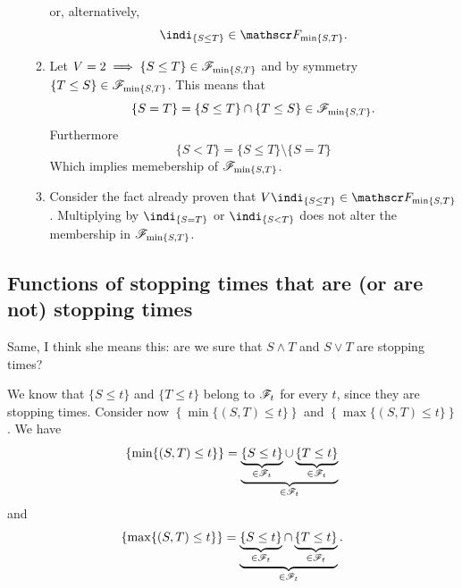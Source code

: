 \documentclass{report}
\begin{document}
\begin{fancyproof}
\begin{enumerate}
\begin{enumerate}
			or, alternatively,
			\[\indi_{\{S\leq T\}}\in\F_{\min\{S,T\}}.\]
			\item Let $V=2\implies\{S\leq T\}\in\mathscr{F}_{\min\{S,T\}}$ and by symmetry $\{T\leq S\}\in\mathscr{F}_{\min\{S,T\}}$. This means that 
			\begin{equation*}
				\{S=T\}=\{S\leq T\}\cap\{T\leq S\}\in\mathscr{F}_{\min\{S,T\}}.
			\end{equation*}
			Furthermore 
			\[\{S<T\}=\{S\leq T\}\setminus\{S=T\}\]
			Which implies memebership of $\mathscr{F}_{\min\{S,T\}}$.
			\item Consider the fact already proven that $V\indi_{\{S\leq T\}}\in\F_{\min\{S,T\}}$. Multiplying by $\indi_{\{S=T\}}$ or $\indi_{\{S<T\}}$ does not alter the membership in $\mathscr{F}_{\min\{S,T\}}$.
		\end{enumerate}
	\end{enumerate}
\end{fancyproof}
\subsection{Functions of stopping times that are (or are not) stopping times}
Same, I think she means this:
are we sure that $S\wedge T$ and $S\vee T$ are stopping times?
\begin{fancyproof}
	We know that $\{S\leq t\}$ and $\{T\leq t\}$ belong to $\mathscr{F}_t$ for every $t$, since they are stopping times. Consider now $\left\{\min\{(S,T)\leq t\}\right\}$ and $\left\{\max\{(S,T)\leq t\}\right\}$. We have
	\begin{equation*}
		\left\{\min\{(S,T)\leq t\}\right\}=\underbrace{\underbrace{\{S\leq t\}}_{\in\mathscr{F}_t}\cup\underbrace{\{T\leq t\}}_{\in\mathscr{F}_t}}_{\in\mathscr{F}_t}
	\end{equation*}
	and 
	\begin{equation*}
		\left\{\max\{(S,T)\leq t\}\right\}=\underbrace{\underbrace{\{S\leq t\}}_{\in\mathscr{F}_t}\cap\underbrace{\{T\leq t\}}_{\in\mathscr{F}_t}}_{\in\mathscr{F}_t}.
	\end{equation*}
\end{fancyproof}
\end{document}
